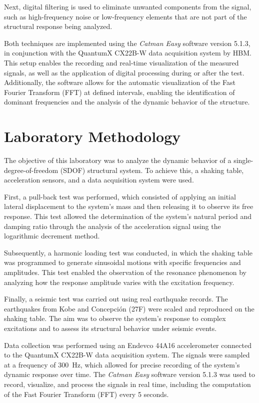 \documentclass{article}  %
\begin{document}
Next, digital filtering is used to eliminate unwanted components from the signal, such as high-frequency noise or low-frequency elements that are not part of the structural response being analyzed.

Both techniques are implemented using the \textit{Catman Easy} software version 5.1.3, in conjunction with the QuantumX CX22B-W data acquisition system by HBM. This setup enables the recording and real-time visualization of the measured signals, as well as the application of digital processing during or after the test. Additionally, the software allows for the automatic visualization of the Fast Fourier Transform (FFT) at defined intervals, enabling the identification of dominant frequencies and the analysis of the dynamic behavior of the structure.


\newpage
\section{Laboratory Methodology}

The objective of this laboratory was to analyze the dynamic behavior of a single-degree-of-freedom (SDOF) structural system. To achieve this, a shaking table, acceleration sensors, and a data acquisition system were used.

First, a pull-back test was performed, which consisted of applying an initial lateral displacement to the system's mass and then releasing it to observe its free response. This test allowed the determination of the system’s natural period and damping ratio through the analysis of the acceleration signal using the logarithmic decrement method.

Subsequently, a harmonic loading test was conducted, in which the shaking table was programmed to generate sinusoidal motions with specific frequencies and amplitudes. This test enabled the observation of the resonance phenomenon by analyzing how the response amplitude varies with the excitation frequency.

Finally, a seismic test was carried out using real earthquake records. The earthquakes from Kobe and Concepción (27F) were scaled and reproduced on the shaking table. The aim was to observe the system’s response to complex excitations and to assess its structural behavior under seismic events.

Data collection was performed using an Endevco 44A16 accelerometer connected to the QuantumX CX22B-W data acquisition system. The signals were sampled at a frequency of 300~Hz, which allowed for precise recording of the system's dynamic response over time. The \textit{Catman Easy} software version 5.1.3 was used to record, visualize, and process the signals in real time, including the computation of the Fast Fourier Transform (FFT) every 5 seconds.
\end{document}
